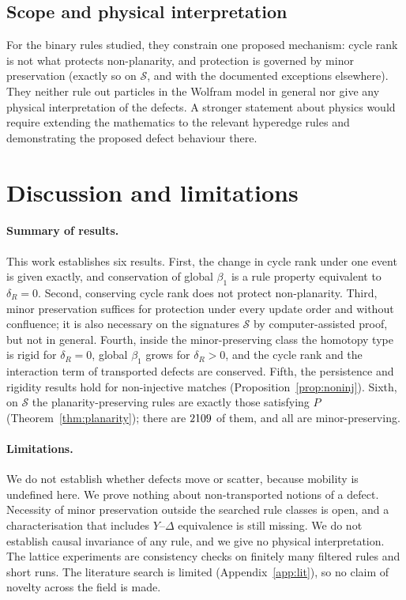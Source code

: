 \documentclass[10pt]{article}
\theoremstyle{definition}
\theoremstyle{plain}
\theoremstyle{remark}
\newcommand{\Betti}{\beta_1}
\begin{document}
\subsection{Scope and physical interpretation}
For the binary rules studied, they constrain one proposed mechanism: cycle rank is not what protects non-planarity, and protection is governed by minor preservation (exactly so on $\mathcal S$, and with the documented exceptions elsewhere). They neither rule out particles in the Wolfram model in general nor give any physical interpretation of the defects. A stronger statement about physics would require extending the mathematics to the relevant hyperedge rules and demonstrating the proposed defect behaviour there.

\section{Discussion and limitations}\label{sec:disc}
\paragraph{Summary of results.} This work establishes six results. First, the change in cycle rank under one event is given exactly, and conservation of global $\Betti$ is a rule property equivalent to $\delta_R=0$. Second, conserving cycle rank does not protect non-planarity. Third, minor preservation suffices for protection under every update order and without confluence; it is also necessary on the signatures $\mathcal S$ by computer-assisted proof, but not in general. Fourth, inside the minor-preserving class the homotopy type is rigid for $\delta_R=0$, global $\Betti$ grows for $\delta_R>0$, and the cycle rank and the interaction term of transported defects are conserved. Fifth, the persistence and rigidity results hold for non-injective matches (Proposition~\ref{prop:noninj}). Sixth, on $\mathcal S$ the planarity-preserving rules are exactly those satisfying $P$ (Theorem~\ref{thm:planarity}); there are $2109$ of them, and all are minor-preserving.
\paragraph{Limitations.} We do not establish whether defects move or scatter, because mobility is undefined here. We prove nothing about non-transported notions of a defect. Necessity of minor preservation outside the searched rule classes is open, and a characterisation that includes $Y$--$\Delta$ equivalence is still missing. We do not establish causal invariance of any rule, and we give no physical interpretation. The lattice experiments are consistency checks on finitely many filtered rules and short runs. The literature search is limited (Appendix~\ref{app:lit}), so no claim of novelty across the field is made.
\end{document}
